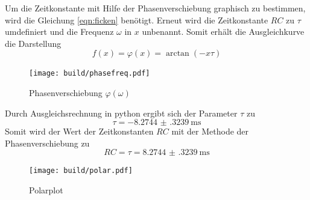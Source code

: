 Um die Zeitkonstante mit Hilfe der Phasenverschiebung graphisch zu bestimmen, wird die Gleichung \eqref{eqn:ficken} benötigt.
Erneut wird die Zeitkonstante $RC$ zu $\tau$ umdefiniert und die Frequenz $\omega$ in $x$ unbenannt.
Somit erhält die Ausgleichkurve die Darstellung 
\begin{equation}
    f \left( x \right) = \varphi \left ( x \right ) = \arctan \left( - x \tau \right)
\end{equation}
\begin{figure}
    \centering
    \caption{Phasenverschiebung $\varphi \left ( \omega \right )$}
    \label{fig:phiw}
    \texttt{[image: build/phasefreq.pdf]}
\end{figure}
Durch Ausgleichsrechnung in python ergibt sich der Parameter $\tau$ zu 
\begin{equation*}
    \tau = \SI{-8.2744(3239)}{\milli\second}
\end{equation*}
Somit wird der Wert der Zeitkonstanten $RC$ mit der Methode der Phasenverschiebung zu
\begin{equation*}
    RC =     \tau = \SI{8.2744(3239)}{\milli\second}
\end{equation*} 
\begin{figure}
    \centering
    \caption{Polarplot}
    \label{fig:polar}
    \texttt{[image: build/polar.pdf]}
\end{figure}